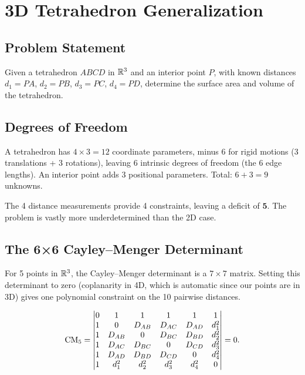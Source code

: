 \chapter{3D Tetrahedron Generalization}
\label{ch:tetrahedron}

\section{Problem Statement}
Given a tetrahedron $ABCD$ in $\mathbb{R}^3$ and an interior point $P$, with known distances $d_1 = PA$, $d_2 = PB$, $d_3 = PC$, $d_4 = PD$, determine the surface area and volume of the tetrahedron.

\section{Degrees of Freedom}
A tetrahedron has $4 \times 3 = 12$ coordinate parameters, minus $6$ for rigid motions (3 translations + 3 rotations), leaving $6$ intrinsic degrees of freedom (the 6 edge lengths). An interior point adds $3$ positional parameters. Total: $6 + 3 = 9$ unknowns.

The 4 distance measurements provide 4 constraints, leaving a deficit of $\mathbf{5}$. The problem is vastly more underdetermined than the 2D case.

\section{The 6×6 Cayley--Menger Determinant}
For 5 points in $\mathbb{R}^3$, the Cayley--Menger determinant is a $7 \times 7$ matrix. Setting this determinant to zero (coplanarity in 4D, which is automatic since our points are in 3D) gives one polynomial constraint on the 10 pairwise distances.

\begin{equation}
\mathrm{CM}_5 = \begin{vmatrix}
0 & 1 & 1 & 1 & 1 & 1 \\
1 & 0 & D_{AB} & D_{AC} & D_{AD} & d_1^2 \\
1 & D_{AB} & 0 & D_{BC} & D_{BD} & d_2^2 \\
1 & D_{AC} & D_{BC} & 0 & D_{CD} & d_3^2 \\
1 & D_{AD} & D_{BD} & D_{CD} & 0 & d_4^2 \\
1 & d_1^2 & d_2^2 & d_3^2 & d_4^2 & 0
\end{vmatrix} = 0.
\end{equation}

